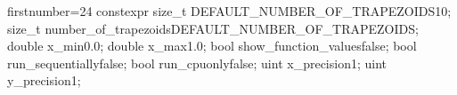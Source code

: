 \begin{cppcode*}{firstnumber=24}
    constexpr size_t DEFAULT_NUMBER_OF_TRAPEZOIDS{10};
    size_t number_of_trapezoids{DEFAULT_NUMBER_OF_TRAPEZOIDS};
    double x_min{0.0};
    double x_max{1.0};
    bool show_function_values{false};
    bool run_sequentially{false};
    bool run_cpuonly{false};
    uint x_precision{1};
    uint y_precision{1};
\end{cppcode*}
